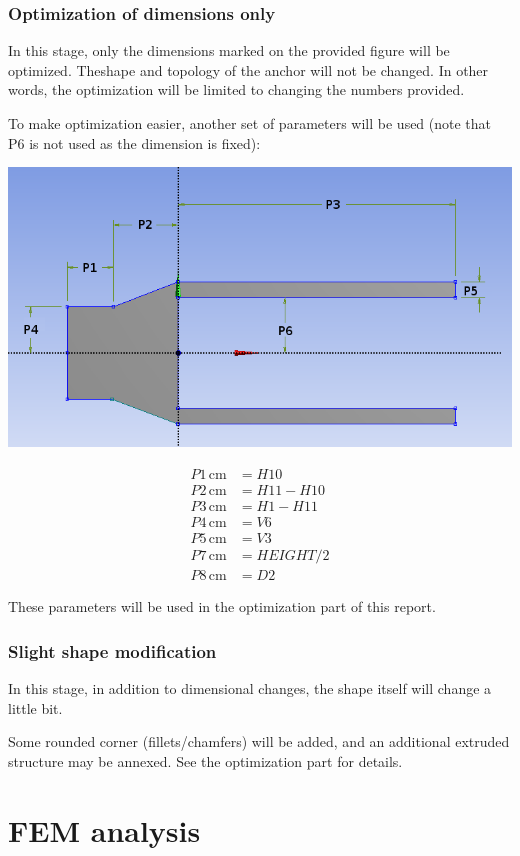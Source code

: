 \documentclass[a4paper,14pt]{extarticle}
\newcommand{\cm}{\,\si{\centi\meter}}
\begin{document}
\subsubsection{Optimization of dimensions only}
In this stage, only the dimensions marked on the provided figure will be optimized. Theshape and topology of the anchor will not be changed. In other words, the optimization will be limited to changing the numbers provided.

To make optimization easier, another set of parameters will be used (note that P6 is not used as the dimension is fixed):

\includegraphics[width=\textwidth]{singleParam/NEW_DIM.PNG}

\begin{align*}
P1 \cm &= H10\\
P2 \cm &= H11-H10\\
P3 \cm &= H1-H11\\
P4 \cm &= V6\\
P5 \cm &= V3\\
P7 \cm &= HEIGHT / 2\\
P8 \cm &= D2
\end{align*}

These parameters will be used in the optimization part of this report.
\subsubsection{Slight shape modification}
In this stage, in addition to dimensional changes, the shape itself will change a little bit.

Some rounded corner (fillets/chamfers) will be added, and an additional extruded structure may be annexed. See the optimization part for details.
\section{FEM analysis}
\end{document}
